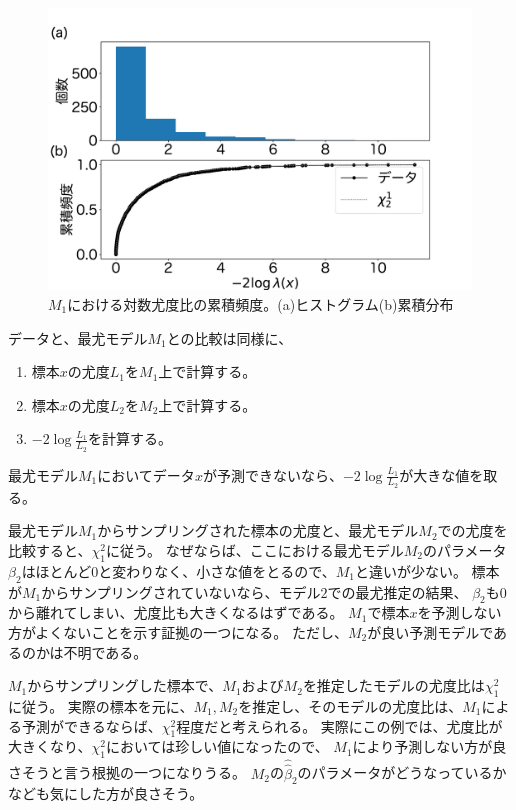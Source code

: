 \begin{figure}
    \begin{center}
        \includegraphics[width=15cm]{./image/04_/loglikeli_poisson_model_test.pdf}
        \caption{$M_1$における対数尤度比の累積頻度。(a)ヒストグラム(b)累積分布}
        \label{fig:loglikelihood_test_simulation_poisson}
    \end{center}
\end{figure}


データと、最尤モデル$M_1$との比較は同様に、
\begin{enumerate}
    \item 標本$x$の尤度$L_1$を$M_1$上で計算する。
    \item 標本$x$の尤度$L_2$を$M_2$上で計算する。
    \item $-2\log\frac{L_1}{L_2}$を計算する。
\end{enumerate}
最尤モデル$M_1$においてデータ$x$が予測できないなら、$-2\log\frac{L_1}{L_2}$が大きな値を取る。

最尤モデル$M_1$からサンプリングされた標本の尤度と、最尤モデル$M_2$での尤度を比較すると、$\chi^2_1$に従う。
なぜならば、ここにおける最尤モデル$M_2$のパラメータ$\beta_2$はほとんど0と変わりなく、小さな値をとるので、$M_1$と違いが少ない。
標本が$M_1$からサンプリングされていないなら、モデル$2$での最尤推定の結果、
$\beta_2$も$0$から離れてしまい、尤度比も大きくなるはずである。
$M_1$で標本$x$を予測しない方がよくないことを示す証拠の一つになる。
ただし、$M_2$が良い予測モデルであるのかは不明である。


$M_1$からサンプリングした標本で、$M_1$および$M_2$を推定したモデルの尤度比は$\chi^2_1$に従う。
実際の標本を元に、$M_1,M_2$を推定し、そのモデルの尤度比は、$M_1$による予測ができるならば、$\chi^2_1$程度だと考えられる。
実際にこの例では、尤度比が大きくなり、$\chi^2_1$においては珍しい値になったので、
$M_1$により予測しない方が良さそうと言う根拠の一つになりうる。
$M_2$の$\hat\hat\beta_2$のパラメータがどうなっているかなども気にした方が良さそう。



